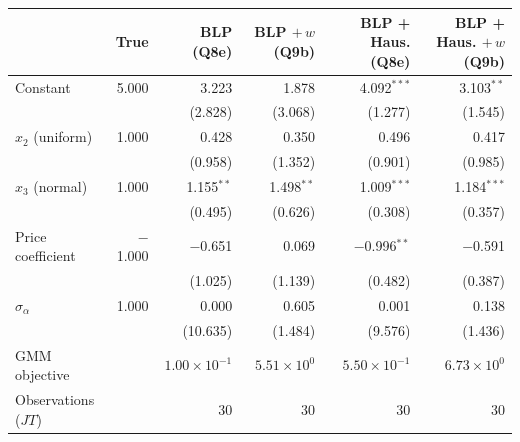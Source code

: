 \begin{tabular}{lrrrrr}
\toprule
 & True & BLP (Q8e) & BLP $+\,w$ (Q9b) & BLP + Haus. (Q8e) & BLP + Haus. $+\,w$ (Q9b) \\
\midrule
Constant & 5.000 & 3.223 & 1.878 & 4.092$^{***}$ & 3.103$^{**}$ \\
 &  & (2.828) & (3.068) & (1.277) & (1.545) \\
$x_2$ (uniform) & 1.000 & 0.428 & 0.350 & 0.496 & 0.417 \\
 &  & (0.958) & (1.352) & (0.901) & (0.985) \\
$x_3$ (normal) & 1.000 & 1.155$^{**}$ & 1.498$^{**}$ & 1.009$^{***}$ & 1.184$^{***}$ \\
 &  & (0.495) & (0.626) & (0.308) & (0.357) \\
Price coefficient & $-$1.000 & $-$0.651 & 0.069 & $-$0.996$^{**}$ & $-$0.591 \\
 &  & (1.025) & (1.139) & (0.482) & (0.387) \\
$\sigma_\alpha$ & 1.000 & 0.000 & 0.605 & 0.001 & 0.138 \\
 &  & (10.635) & (1.484) & (9.576) & (1.436) \\
\midrule
GMM objective &  & $1.00\times10^{-1}$ & $5.51\times10^{0}$ & $5.50\times10^{-1}$ & $6.73\times10^{0}$ \\
Observations ($JT$) &  & 30 & 30 & 30 & 30 \\
\bottomrule
\end{tabular}
